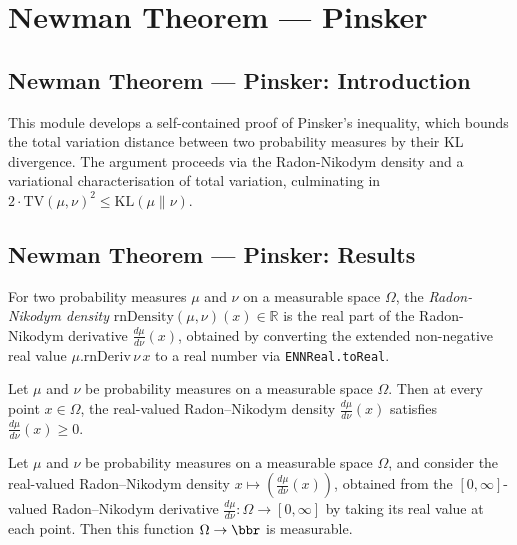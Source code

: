 \section{Newman Theorem --- Pinsker}
\subsection*{Newman Theorem --- Pinsker: Introduction}

This module develops a self-contained proof of Pinsker's inequality, which bounds the
total variation distance between two probability measures by their KL divergence.
The argument proceeds via the Radon-Nikodym density and a variational characterisation
of total variation, culminating in
$2 \cdot \mathrm{TV}(\mu,\nu)^2 \le \mathrm{KL}(\mu \| \nu)$.

\subsection*{Newman Theorem --- Pinsker: Results}

\begin{definition}
\label{CommunicationComplexity.rnDensity}
\leanok
For two probability measures $\mu$ and $\nu$ on a measurable space $\Omega$, the
\emph{Radon-Nikodym density} $\mathrm{rnDensity}(\mu,\nu)(x) \in \mathbb{R}$ is
the real part of the Radon-Nikodym derivative $\frac{d\mu}{d\nu}(x)$, obtained by
converting the extended non-negative real value $\mu.\mathrm{rnDeriv}\,\nu\,x$
to a real number via \texttt{ENNReal.toReal}.
\end{definition}

\begin{theorem}
\label{CommunicationComplexity.rnDensity_nonneg}
\leanok
{}
Let $\mu$ and $\nu$ be probability measures on a measurable space $\Omega$. Then at
every point $x \in \Omega$, the real-valued Radon–Nikodym density $\frac{d\mu}{d\nu}(x)$
satisfies $\frac{d\mu}{d\nu}(x) \ge 0$.
\end{theorem}

\begin{theorem}
\label{CommunicationComplexity.measurable_rnDensity}
\leanok
{}
Let $\mu$ and $\nu$ be probability measures on a measurable space $\Omega$, and consider
the real-valued Radon–Nikodym density $x \mapsto \left(\tfrac{d\mu}{d\nu}(x)\right)$,
obtained from the $[0,\infty]$-valued Radon–Nikodym derivative $\tfrac{d\mu}{d\nu}\colon
\Omega \to [0,\infty]$ by taking its real value at each point. Then this function
$\Omega \to \bbr$ is measurable.
\end{theorem}

